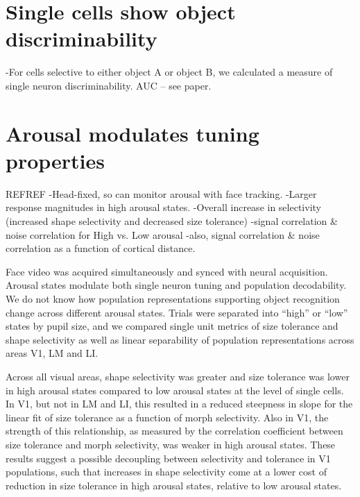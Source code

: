
\section{Single cells show object discriminability}
-For cells selective to either object A or object B, we calculated a measure of single neuron discriminability. AUC -- see paper. 


\section{Arousal modulates tuning properties} REFREF
-Head-fixed, so can monitor arousal with face tracking.
-Larger response magnitudes in high arousal states.
-Overall increase in selectivity (increased shape selectivity and decreased size tolerance)
-signal correlation & noise correlation for High vs. Low arousal
-also, signal correlation & noise correlation as a function of cortical distance. 

Face video was acquired simultaneously and synced with neural acquisition. Arousal states modulate both single neuron tuning and population decodability. We do not know how population representations supporting object recognition change across different arousal states. Trials were separated into “high” or “low” states by pupil size, and we compared single unit metrics of size tolerance and shape selectivity as well as linear separability of population representations across areas V1, LM and LI. 

Across all visual areas, shape selectivity was greater and size tolerance was lower in high arousal states compared to low arousal states at the level of single cells. In V1, but not in LM and LI, this resulted in a reduced steepness in slope for the linear fit of size tolerance as a function of morph selectivity. Also in V1, the strength of this relationship, as measured by the correlation coefficient between size tolerance and morph selectivity, was weaker in high arousal states. These results suggest a possible decoupling between selectivity and tolerance in V1 populations, such that increases in shape selectivity come at a lower cost of reduction in size tolerance in high arousal states, relative to low arousal states.

